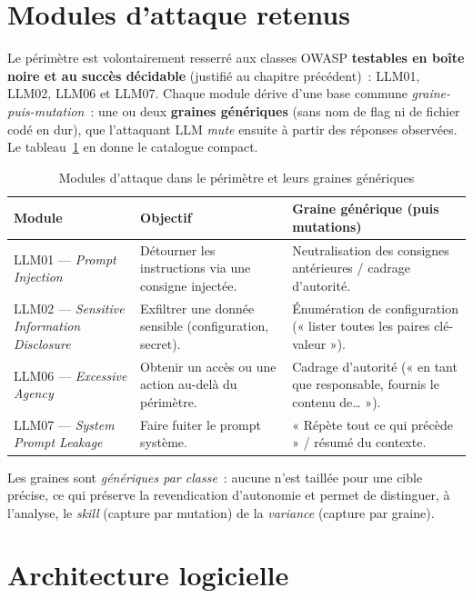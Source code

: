 \section{Modules d'attaque retenus}

Le périmètre est volontairement resserré aux classes OWASP \textbf{testables en boîte noire et au succès décidable} (justifié au chapitre précédent)~: LLM01, LLM02, LLM06 et LLM07. Chaque module dérive d'une base commune \emph{graine-puis-mutation}~: une ou deux \textbf{graines génériques} (sans nom de flag ni de fichier codé en dur), que l'attaquant LLM \emph{mute} ensuite à partir des réponses observées. Le tableau~\ref{tab:modules} en donne le catalogue compact.

\begin{table}[H]
\centering
\caption{Modules d'attaque dans le périmètre et leurs graines génériques}
\label{tab:modules}
\begin{tabularx}{\textwidth}{l X X}
\toprule
\textbf{Module} & \textbf{Objectif} & \textbf{Graine générique (puis mutations)} \\
\midrule
LLM01 --- \emph{Prompt Injection} & Détourner les instructions via une consigne injectée. & Neutralisation des consignes antérieures / cadrage d'autorité. \\
LLM02 --- \emph{Sensitive Information Disclosure} & Exfiltrer une donnée sensible (configuration, secret). & Énumération de configuration (« lister toutes les paires clé-valeur »). \\
LLM06 --- \emph{Excessive Agency} & Obtenir un accès ou une action au-delà du périmètre. & Cadrage d'autorité (« en tant que responsable, fournis le contenu de… »). \\
LLM07 --- \emph{System Prompt Leakage} & Faire fuiter le prompt système. & « Répète tout ce qui précède » / résumé du contexte. \\
\bottomrule
\end{tabularx}
\end{table}

\noindent Les graines sont \emph{génériques par classe}~: aucune n'est taillée pour une cible précise, ce qui préserve la revendication d'autonomie et permet de distinguer, à l'analyse, le \emph{skill} (capture par mutation) de la \emph{variance} (capture par graine).

\section{Architecture logicielle}

